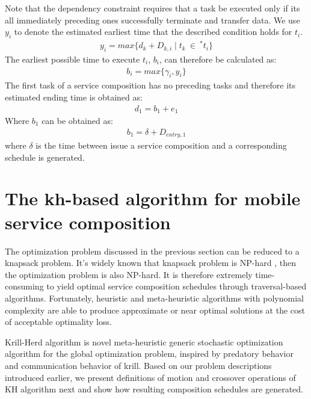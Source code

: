 \documentclass[journal]{IEEEtran}
\begin{document}
Note that the dependency constraint requires that a task be executed only if its all immediately preceding ones successfully terminate and transfer data. We use $y_i$ to denote the estimated earliest time that the described condition holds for $t_i$.
\begin{align}
y_i = max \{d_k + D_{k,i} \mid t_k \ \in \ ^{*}t_i \} 
\end{align}
The earliest possible time to execute $t_i$, $b_i$, can therefore be calculated as:
\begin{align}
b_i = max \{ \gamma_i, y_i \}
\end{align}
The first task of a service composition has no preceding tasks and therefore its estimated ending time is obtained as:
\begin{align}
d_1 = b_1 + e_1
\end{align}
Where $b_1$ can be obtained as:
\begin{align}
b_1 = \delta + D_{entry, 1}
\end{align}
where $\delta$ is the time between issue a service composition and a corresponding schedule is generated.




\section{The kh-based algorithm for mobile service composition}

The optimization problem discussed in the previous section can be reduced to a knapsack problem. It's widely known that knapsack problem is NP-hard \cite{papadimitriou1998combinatorial}, then the optimization problem is also NP-hard. It is therefore extremely time-consuming to yield optimal service composition schedules through traversal-based algorithms. Fortunately, heuristic and meta-heuristic algorithms with polynomial complexity are able to produce approximate or near optimal solutions at the cost of acceptable optimality loss.

Krill-Herd algorithm \cite{gandomi2012krill} is novel meta-heuristic generic stochastic optimization algorithm for the global optimization problem, inspired by predatory behavior and communication behavior of krill. 
Based on our problem descriptions introduced earlier, we present definitions of motion and crossover operations of KH algorithm next and show how resulting composition schedules are generated.
\end{document}
